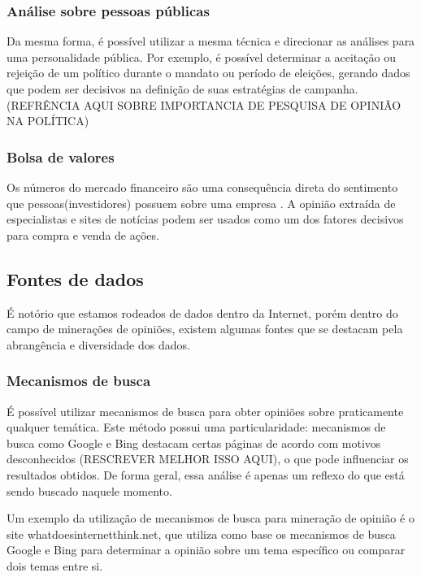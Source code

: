 \subsubsection{Análise sobre pessoas públicas}

Da mesma forma, é possível utilizar a mesma técnica e direcionar as análises para uma personalidade pública. Por exemplo, é possível determinar a aceitação ou rejeição de um político durante o mandato ou período de eleições, gerando dados que podem ser decisivos na definição de suas estratégias de campanha. (REFRÊNCIA AQUI SOBRE IMPORTANCIA DE PESQUISA DE OPINIÃO NA POLÍTICA)

\subsubsection{Bolsa de valores}

Os números do mercado financeiro são uma consequência direta do sentimento que pessoas(investidores) possuem sobre uma empresa \cite{villela2013financcas}. A opinião extraída de especialistas e sites de notícias podem ser usados como um dos fatores decisivos para compra e venda de ações.

\subsection{Fontes de dados}

É notório que estamos rodeados de dados dentro da Internet, porém dentro do campo de minerações de opiniões, existem algumas fontes que se destacam pela abrangência e diversidade dos dados.

\subsubsection{Mecanismos de busca}

É possível utilizar mecanismos de busca para obter opiniões sobre praticamente qualquer temática. Este método possui uma particularidade: mecanismos de busca como Google e Bing destacam certas páginas de acordo com motivos desconhecidos (RESCREVER MELHOR ISSO AQUI), o que pode influenciar os resultados obtidos. De forma geral, essa análise é apenas um reflexo do que está sendo buscado naquele momento.

Um exemplo da utilização de mecanismos de busca para mineração de opinião é o site whatdoesinternetthink.net\cite{whatdoesinternetthink}, que utiliza como base os mecanismos de busca Google e Bing para determinar a opinião sobre um tema específico ou comparar dois temas entre si.


